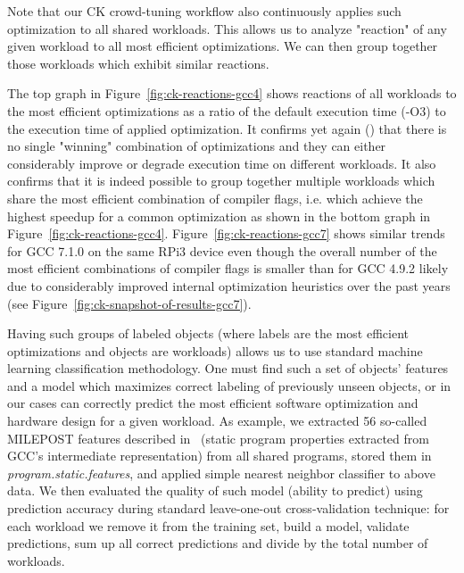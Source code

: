 Note that our CK crowd-tuning workflow also continuously applies
such optimization to all shared workloads.
%
This allows us to analyze "reaction" of any given workload 
to all most efficient optimizations.
%
We can then group together those workloads which exhibit similar reactions.

The top graph in Figure~\ref{fig:ck-reactions-gcc4} shows reactions of all workloads 
to the most efficient optimizations as a ratio of the default execution time (-O3) 
to the execution time of applied optimization.
%
It confirms yet again (\cite{cm:29db2248aba45e59:cd11e3a188574d80}) that there is no single "winning" 
combination of optimizations and they can either considerably improve or degrade execution time 
on different workloads.
%
It also confirms that it is indeed possible to group together multiple workloads 
which share the most efficient combination of compiler flags, i.e. which achieve 
the highest speedup for a common optimization as shown in the bottom graph 
in Figure~\ref{fig:ck-reactions-gcc4}.
%
Figure~\ref{fig:ck-reactions-gcc7} shows similar trends for GCC 7.1.0 on the same RPi3 device
even though the overall number of the most efficient combinations of compiler flags is smaller 
than for GCC 4.9.2 likely due to considerably improved internal optimization heuristics over the past years
(see Figure~\ref{fig:ck-snapshot-of-results-gcc7}).

Having such groups of labeled objects (where labels are the most efficient optimizations
and objects are workloads) allows us to use standard machine learning classification methodology.
%
One must find such a set of objects' features and a model which maximizes 
correct labeling of previously unseen objects, or in our cases can correctly predict 
the most efficient software optimization and hardware design for a given workload.
%
As example, we extracted 56 so-called MILEPOST features described in~\cite{29db2248aba45e59:a31e374796869125} 
(static program properties extracted from GCC's intermediate representation) 
from all shared programs, stored them in \emph{program.static.features},
and applied simple nearest neighbor classifier to above data.
%
We then evaluated the quality of such model (ability to predict) using prediction accuracy
during standard leave-one-out cross-validation technique: for each workload we remove it
from the training set, build a model, validate predictions, sum up all correct predictions 
and divide by the total number of workloads.

